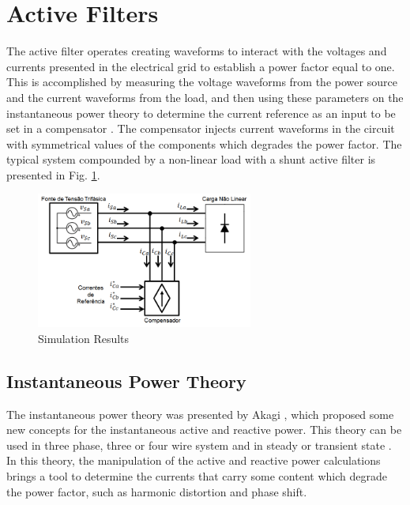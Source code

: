 \section{Active Filters}

The active filter operates creating waveforms to interact with the voltages and currents presented in the electrical grid to establish a power factor equal to one. This is accomplished by measuring the voltage waveforms from the power source and the current waveforms from the load, and then using these parameters on the instantaneous power theory to determine the current reference as an input to be set in a compensator \cite{Akagi2006}. The compensator injects current waveforms in the circuit with symmetrical values of the components which degrades the power factor. The typical system compounded by a non-linear load with a shunt active filter is presented in Fig. \ref{fig:compensador.png}.

\begin{figure}[!h]
\centering
\includegraphics[width=2.8in]{Figures/compensador.png}
\caption{Simulation Results}
\label{fig:compensador.png}
\end{figure}



\subsection{Instantaneous Power Theory}

The instantaneous power theory was presented by Akagi \cite{Akagi1984}, which proposed some new concepts for the instantaneous active and reactive power. This theory can be used in three phase, three or four wire system and in steady or transient state \cite{Akagi2007}. In this theory, the manipulation of the active and reactive power calculations brings a tool to determine the currents that carry some content which degrade the power factor, such as harmonic distortion and phase shift.

